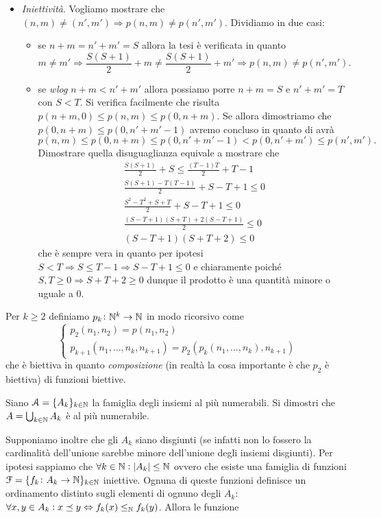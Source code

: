 \documentclass[a4paper]{article}\par \usepackage{style}\par
\begin{document}
\begin{itemize}
\begin{pind}
  \end{pind}
\item \emph{Iniettività}. Vogliamo mostrare che $ (n, m) \neq (n', m') \Rightarrow p(n, m) \neq p(n', m') $. Dividiamo in due casi:
  \begin{itemize}
  \item se $ n + m = n' + m' = S $ allora la tesi è verificata in quanto \[m \neq m' \Rightarrow \frac{S (S + 1)}{2} + m \neq \frac{S (S + 1)}{2} + m' \Rightarrow  p(n, m) \neq p(n', m').\]
  \item se \emph{wlog} $ n + m < n' + m' $ allora possiamo porre $ n + m = S $ e $ n' + m' = T $ con $ S < T $. Si verifica facilmente che risulta $ p(n + m, 0) \leq p(n, m) \leq p(0, n + m) $. Se allora dimostriamo che $ p(0, n + m) \leq p(0, n' + m' - 1) $ avremo concluso in quanto di avrà \[p(n, m) \leq p(0, n + m) \leq p(0, n' + m' - 1) < p(0, n' + m') \leq p(n', m').\] Dimostrare quella disuguaglianza equivale a mostrare che
    \begin{gather*}
      \frac{S(S + 1)}{2} + S \leq \frac{(T - 1)T}{2} + T - 1 \\
      \frac{S(S + 1) - T(T - 1)}{2} + S - T + 1 \leq 0 \\
      \frac{S^2 - T^2 + S + T}{2} + S - T + 1 \leq 0 \\
      \frac{(S - T + 1)(S + T) + 2(S - T + 1)}{2} \leq 0 \\
      (S - T + 1)(S + T + 2) \leq 0
    \end{gather*}
    che è sempre vera in quanto per ipotesi $ S < T \Rightarrow S \leq T - 1 \Rightarrow S - T + 1 \leq 0 $ e chiaramente poiché $ S, T \geq 0 \Rightarrow S + T + 2 \geq 0 $ dunque il prodotto è una quantità minore o uguale a 0.
  \end{itemize}
\end{itemize}
\textsf{Per $ k \geq 2 $ definiamo $ p_k \colon \mathbb{N}^k \to \mathbb{N} $ in modo ricorsivo come
  \[\begin{cases}
      p_2(n_1, n_2) = p(n_1, n_2) \\
      p_{k + 1}(n_1, \dots, n_k, n_{k + 1}) = p_2(p_{k}(n_1, \dots, n_k), n_{k + 1})
    \end{cases}\]
  che è biettiva in quanto \emph{composizione} (in realtà la cosa importante è che $ p_2 $ è biettiva) di funzioni biettive.}\par \begin{es}
  Siano $ \mathcal{A} = \{A_k\}_{k \in \mathbb{N}} $ la famiglia degli insiemi al più numerabili. Si dimostri che $ A = \nolinebreak \bigcup_{k \in \N} A_k $ è al più numerabile.
\end{es}\par Supponiamo inoltre che gli $ A_k $ siano disgiunti (se infatti non lo fossero la cardinalità dell'unione sarebbe minore dell'unione degli insiemi disgiunti). Per ipotesi sappiamo che $ \forall k \in \mathbb{N} : |A_k| \leq \mathbb{N} $ ovvero che esiste una famiglia di funzioni $ \mathcal{F} = \{f_k \colon A_k \to \mathbb{N}\}_{k \in \mathbb{N}} $ iniettive. Ognuna di queste funzioni definisce un ordinamento distinto sugli elementi di ognuno degli $ A_k $: $ \forall x, y \in A_k : x \preceq y \Leftrightarrow f_k(x) \leq_{\mathbb{N}} f_k(y) $. Allora le funzione
\end{document}

